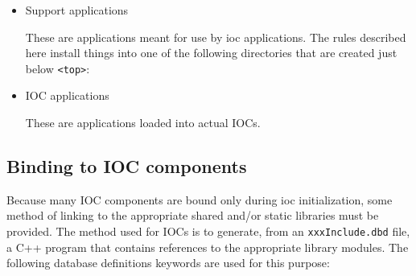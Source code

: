 \begin{itemize}
\item Support applications

These are applications meant for use by ioc applications.
The rules described here install things into one of the following directories that are created just below \verb|<top>|:


\item IOC applications

These are applications loaded into actual IOCs.

\end{itemize}

\subsection{Binding to IOC components}

Because many IOC components are bound only during ioc initialization, some method of linking to the appropriate shared and/or static libraries must be provided.
The method used for IOCs is to generate, from an \verb|xxxInclude.dbd| file, a C++ program that contains references to the appropriate library modules.
The following database definitions keywords are used for this purpose:


